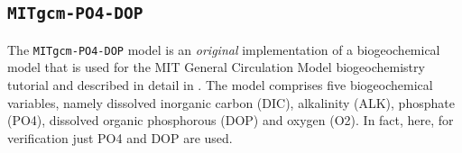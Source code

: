 \documentclass{article}
\begin{document}
%
%
\subsection{\texttt{MITgcm-PO4-DOP}}

The \texttt{MITgcm-PO4-DOP} model is an \emph{original} implementation of
a biogeochemical model that is used for the 
MIT General Circulation Model \citep[cf.][MITgcm]{MAHPH97}
biogeochemistry tutorial and described in detail in
\citep[][]{DuSoScSt05}.
%
The model comprises five biogeochemical variables,
namely
dissolved inorganic carbon (DIC),
alkalinity (ALK),
phosphate (PO4),
dissolved organic phosphorous (DOP) and
oxygen (O2).
%
In fact, here,
for verification just PO4 and DOP are used.

%
%
%


%
\end{document}

